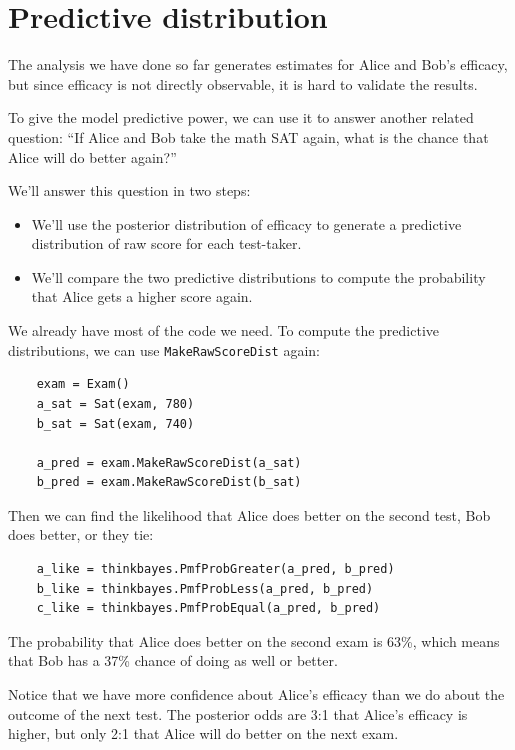 \documentclass[12pt]{book}
\begin{document}
\section{Predictive distribution}

The analysis we have done so far generates estimates for
Alice and Bob's efficacy, but since efficacy is not directly
observable, it is hard to validate the results.

To give the model predictive power, we can use it to answer
another related question: ``If Alice and Bob take the math SAT
again, what is the chance that Alice will do better again?''

We'll answer this question in two steps:

\begin{itemize}

\item We'll use the posterior distribution of efficacy to
generate a predictive distribution of raw score for each test-taker.

\item We'll compare the two predictive distributions to compute
the probability that Alice gets a higher score again.

\end{itemize}

We already have most of the code we need.  To compute
the predictive distributions, we can use \verb"MakeRawScoreDist" again:

\begin{verbatim}
    exam = Exam()
    a_sat = Sat(exam, 780)
    b_sat = Sat(exam, 740)

    a_pred = exam.MakeRawScoreDist(a_sat)
    b_pred = exam.MakeRawScoreDist(b_sat)
\end{verbatim}

Then we can find the likelihood that Alice does better on the second
test, Bob does better, or they tie:

\begin{verbatim}
    a_like = thinkbayes.PmfProbGreater(a_pred, b_pred)
    b_like = thinkbayes.PmfProbLess(a_pred, b_pred)
    c_like = thinkbayes.PmfProbEqual(a_pred, b_pred)
\end{verbatim}

The probability that Alice does better on the second exam is 63\%,
which means that Bob has a 37\% chance of doing as well or better.

Notice that we have more confidence about Alice's efficacy than we do
about the outcome of the next test.  The posterior odds are 3:1 that
Alice's efficacy is higher, but only 2:1 that Alice will do better on
the next exam.
\end{document}
